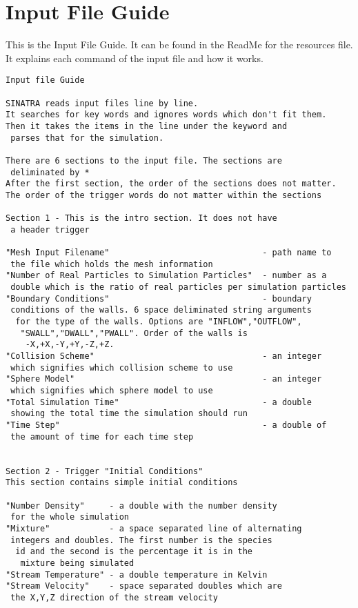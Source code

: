 \chapter{Input File Guide}
\label{app:inputfileguide}
This is the Input File Guide. It can be found in the ReadMe for the resources file. It explains each command of the input file and how it works.

\begin{verbatim}
Input file Guide  
  
SINATRA reads input files line by line.   
It searches for key words and ignores words which don't fit them.   
Then it takes the items in the line under the keyword and
 parses that for the simulation.  
  
There are 6 sections to the input file. The sections are
 deliminated by *  
After the first section, the order of the sections does not matter.  
The order of the trigger words do not matter within the sections  
  
Section 1 - This is the intro section. It does not have
 a header trigger  
  
"Mesh Input Filename"                               - path name to 
 the file which holds the mesh information  
"Number of Real Particles to Simulation Particles"  - number as a 
 double which is the ratio of real particles per simulation particles  
"Boundary Conditions"                               - boundary
 conditions of the walls. 6 space deliminated string arguments
  for the type of the walls. Options are "INFLOW","OUTFLOW",
   "SWALL","DWALL","PWALL". Order of the walls is
    -X,+X,-Y,+Y,-Z,+Z.  
"Collision Scheme"                                  - an integer
 which signifies which collision scheme to use  
"Sphere Model"                                      - an integer
 which signifies which sphere model to use  
"Total Simulation Time"                             - a double
 showing the total time the simulation should run  
"Time Step"                                         - a double of
 the amount of time for each time step  
  
  
Section 2 - Trigger "Initial Conditions"   
This section contains simple initial conditions  
  
"Number Density"     - a double with the number density
 for the whole simulation  
"Mixture"            - a space separated line of alternating
 integers and doubles. The first number is the species
  id and the second is the percentage it is in the
   mixture being simulated  
"Stream Temperature" - a double temperature in Kelvin  
"Stream Velocity"    - space separated doubles which are 
 the X,Y,Z direction of the stream velocity  
  

\end{verbatim}
